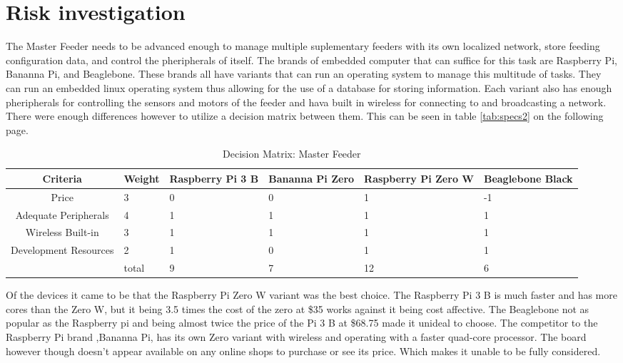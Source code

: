 \documentclass[12pt]{article}
\begin{document}
\section{Risk investigation}
The Master Feeder needs to be advanced enough to manage multiple suplementary
feeders with its own localized network, store feeding configuration data, and control
the pheripherals of itself.  The brands of embedded computer that can suffice
for this task are Raspberry Pi, Bananna Pi, and Beaglebone.  These brands all
have variants that can run an operating system to manage this multitude of
tasks.  They can run an embedded linux operating system thus allowing for the
use of a database for storing information.  Each variant also has enough pheripherals
for controlling the sensors and motors of the feeder and hava built in wireless
for connecting to and broadcasting a network.  There were enough differences however
to utilize a decision matrix between them. This can be seen in table \autoref{tab:specs2}
on the following page.

\begin{table}[H]
    \centering
    \caption{Decision Matrix: Master Feeder}
    \label{tab:specs2}
    \begin{tabularx}{\linewidth}{cXXXXX} \toprule
        Criteria & Weight & Raspberry Pi 3 B & Bananna Pi Zero & Raspberry Pi Zero W & Beaglebone Black\\ \midrule
        Price                 & 3 & 0 & 0 & 1 & -1 \\
        Adequate Peripherals  & 4 & 1 & 1 & 1 & 1\\
        Wireless Built-in     & 3 & 1 & 1 & 1 & 1\\
        Development Resources & 2 & 1 & 0 & 1 & 1\\
        & total                   & 9 & 7 & 12 & 6
    \end{tabularx}
\end{table}

Of the devices it came to be that the Raspberry Pi Zero W variant was the best choice.  The Raspberry Pi 3 B
is much faster and has more cores than the Zero W, but it being 3.5 times the cost of the zero at \$35 works against
it being cost affective.  The Beaglebone not as popular as the Raspberry pi and being almost twice the price of the Pi 3 B
at \$68.75 made it unideal to choose.  The competitor to the Raspberry Pi brand ,Bananna Pi, has its own Zero variant
with wireless and operating with a faster quad-core processor.  The board however though doesn't appear available on any
online shops to purchase or see its price.  Which makes it unable to be fully considered.
\end{document}
